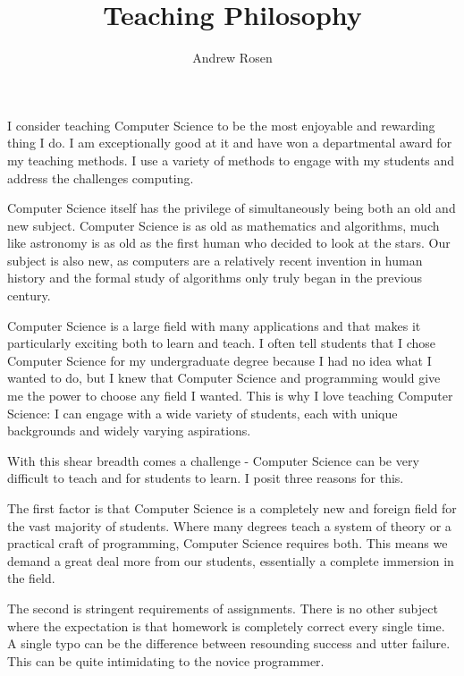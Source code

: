 \documentclass[10pt, a4paper]{article}
\author{Andrew Rosen}
\title{Teaching Philosophy}
\date{}
\begin{document}
\maketitle


I consider teaching Computer Science to be the most enjoyable and rewarding thing I do.
I am exceptionally good at it and have won a departmental award for my teaching methods.
I use a variety of methods to engage with my students and address the challenges computing.





Computer Science itself has the privilege of simultaneously being both an old and new subject.
Computer Science is as old as mathematics and algorithms, much like astronomy is as old as the first human who decided to look at the stars.
Our subject is also new, as computers are a relatively recent invention in human history and the formal study of algorithms only truly began in the previous century.


Computer Science is a large field with many applications and that makes it particularly exciting both to learn and teach.
I often tell students that I chose Computer Science for my undergraduate degree because I had no idea what I wanted to do, but I knew that Computer Science and programming would give me the power to choose any field I wanted.
This is why I love teaching Computer Science:  I can engage with a wide variety of students, each with unique backgrounds and widely varying aspirations.

With this shear breadth comes a challenge - Computer Science can be very difficult to teach and for students to learn.
I posit three reasons for this.

The first factor is that Computer Science is a completely new and foreign field for the vast majority of students.
Where many degrees teach a system of theory or a practical craft of programming, Computer Science requires both. 
This means we demand a great deal more from our students, essentially a complete immersion in the field.

The second is stringent requirements of assignments.
There is no other subject where the expectation is that homework is completely correct every single time.
A single typo can be the difference between resounding success and utter failure.
This can be quite intimidating to the novice programmer.
\end{document}
